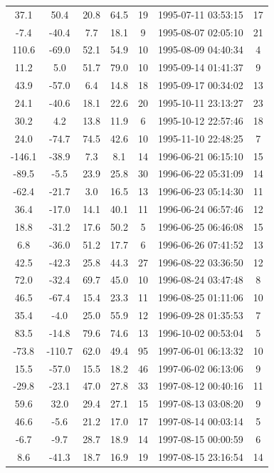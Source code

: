 \documentclass[12pt,a4paper]{report}
\begin{document}
\begin{longtable}{|c|c|c|c|c|c|c|}
37.1 & 50.4 & 20.8 & 64.5 &  19 & 1995-07-11 03:53:15 &  17 \\
-7.4 & -40.4 & 7.7 & 18.1 &   9 & 1995-08-07 02:05:10 &  21 \\
110.6 & -69.0 & 52.1 & 54.9 &  10 & 1995-08-09 04:40:34 &   4 \\
11.2 & 5.0 & 51.7 & 79.0 &  10 & 1995-09-14 01:41:37 &   9 \\
43.9 & -57.0 & 6.4 & 14.8 &  18 & 1995-09-17 00:34:02 &  13 \\
24.1 & -40.6 & 18.1 & 22.6 &  20 & 1995-10-11 23:13:27 &  23 \\
30.2 & 4.2 & 13.8 & 11.9 &   6 & 1995-10-12 22:57:46 &  18 \\
24.0 & -74.7 & 74.5 & 42.6 &  10 & 1995-11-10 22:48:25 &   7 \\
-146.1 & -38.9 & 7.3 & 8.1 &  14 & 1996-06-21 06:15:10 &  15 \\
-89.5 & -5.5 & 23.9 & 25.8 &  30 & 1996-06-22 05:31:09 &  14 \\
-62.4 & -21.7 & 3.0 & 16.5 &  13 & 1996-06-23 05:14:30 &  11 \\
36.4 & -17.0 & 14.1 & 40.1 &  11 & 1996-06-24 06:57:46 &  12 \\
18.8 & -31.2 & 17.6 & 50.2 &   5 & 1996-06-25 06:46:08 &  15 \\
6.8 & -36.0 & 51.2 & 17.7 &   6 & 1996-06-26 07:41:52 &  13 \\
42.5 & -42.3 & 25.8 & 44.3 &  27 & 1996-08-22 03:36:50 &  12 \\
72.0 & -32.4 & 69.7 & 45.0 &  10 & 1996-08-24 03:47:48 &   8 \\
46.5 & -67.4 & 15.4 & 23.3 &  11 & 1996-08-25 01:11:06 &  10 \\
35.4 & -4.0 & 25.0 & 55.9 &  12 & 1996-09-28 01:35:53 &   7 \\
83.5 & -14.8 & 79.6 & 74.6 &  13 & 1996-10-02 00:53:04 &   5 \\
-73.8 & -110.7 & 62.0 & 49.4 &  95 & 1997-06-01 06:13:32 &  10 \\
15.5 & -57.0 & 15.5 & 18.2 &  46 & 1997-06-02 06:13:06 &   9 \\
-29.8 & -23.1 & 47.0 & 27.8 &  33 & 1997-08-12 00:40:16 &  11 \\
59.6 & 32.0 & 29.4 & 27.1 &  15 & 1997-08-13 03:08:20 &   9 \\
46.6 & -5.6 & 21.2 & 17.0 &  17 & 1997-08-14 00:03:14 &   5 \\
-6.7 & -9.7 & 28.7 & 18.9 &  14 & 1997-08-15 00:00:59 &   6 \\
8.6 & -41.3 & 18.7 & 16.9 &  19 & 1997-08-15 23:16:54 &  14 \\

\end{longtable}
\end{document}
